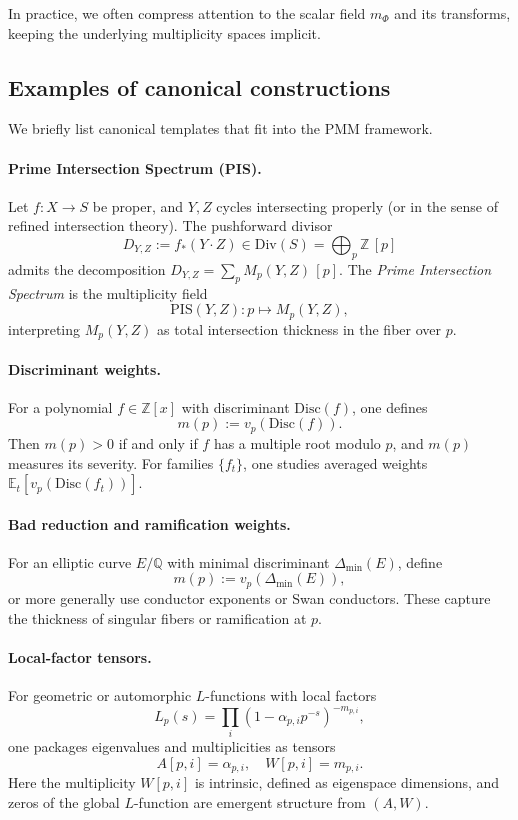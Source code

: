 \documentclass[11pt]{article}
\theoremstyle{definition}
\theoremstyle{plain}
\theoremstyle{remark}
\newcommand{\ZZ}{\mathbb{Z}}
\newcommand{\QQ}{\mathbb{Q}}
\newcommand{\EE}{\mathbb{E}}
\newcommand{\1}{\mathbb{1}}
\begin{document}
In practice, we often compress attention to the scalar field \(m_\Phi\) and its transforms, keeping the underlying multiplicity spaces implicit.

\subsection{Examples of canonical constructions}

We briefly list canonical templates that fit into the PMM framework.

\paragraph{Prime Intersection Spectrum (PIS).} Let \(f: X\to S\) be proper, and \(Y,Z\) cycles intersecting properly (or in the sense of refined intersection theory). The pushforward divisor
\[
  D_{Y,Z} := f_*(Y\cdot Z)\in \mathrm{Div}(S) = \bigoplus_p \ZZ\,[p]
\]
admits the decomposition \(D_{Y,Z} = \sum_p M_p(Y,Z)\,[p]\). The \emph{Prime Intersection Spectrum} is the multiplicity field
\[
  \mathrm{PIS}(Y,Z)\colon p\longmapsto M_p(Y,Z),
\]
interpreting \(M_p(Y,Z)\) as total intersection thickness in the fiber over \(p\).

\paragraph{Discriminant weights.} For a polynomial \(f\in \ZZ[x]\) with discriminant \(\mathrm{Disc}(f)\), one defines
\[
  m(p) := v_p(\mathrm{Disc}(f)).
\]
Then \(m(p) >0\) if and only if \(f\) has a multiple root modulo \(p\), and \(m(p)\) measures its severity. For families \(\{f_t\}\), one studies averaged weights \(\EE_t[v_p(\mathrm{Disc}(f_t))]\).

\paragraph{Bad reduction and ramification weights.} For an elliptic curve \(E/\QQ\) with minimal discriminant \(\Delta_{\min}(E)\), define
\[
  m(p) := v_p(\Delta_{\min}(E)),
\]
or more generally use conductor exponents or Swan conductors. These capture the thickness of singular fibers or ramification at \(p\).

\paragraph{Local-factor tensors.} For geometric or automorphic \(L\)-functions with local factors
\[
  L_p(s) = \prod_i (1-\alpha_{p,i}p^{-s})^{-m_{p,i}},
\]
one packages eigenvalues and multiplicities as tensors
\[
  A[p,i] = \alpha_{p,i},\quad W[p,i] = m_{p,i}.
\]
Here the multiplicity \(W[p,i]\) is intrinsic, defined as eigenspace dimensions, and zeros of the global \(L\)-function are emergent structure from \((A,W)\).
\end{document}
